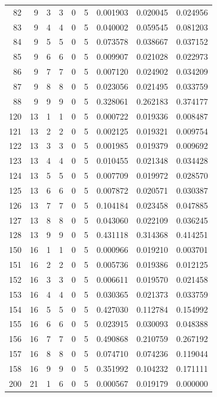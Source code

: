 \begin{longtable}{rrrrrrrrr}
82 & 9 & 3 & 3 & 0 & 5 & 0.001903 & 0.020045 & 0.024956 \\
83 & 9 & 4 & 4 & 0 & 5 & 0.040002 & 0.059545 & 0.081203 \\
84 & 9 & 5 & 5 & 0 & 5 & 0.073578 & 0.038667 & 0.037152 \\
85 & 9 & 6 & 6 & 0 & 5 & 0.009907 & 0.021028 & 0.022973 \\
86 & 9 & 7 & 7 & 0 & 5 & 0.007120 & 0.024902 & 0.034209 \\
87 & 9 & 8 & 8 & 0 & 5 & 0.023056 & 0.021495 & 0.033759 \\
88 & 9 & 9 & 9 & 0 & 5 & 0.328061 & 0.262183 & 0.374177 \\
120 & 13 & 1 & 1 & 0 & 5 & 0.000722 & 0.019336 & 0.008487 \\
121 & 13 & 2 & 2 & 0 & 5 & 0.002125 & 0.019321 & 0.009754 \\
122 & 13 & 3 & 3 & 0 & 5 & 0.001985 & 0.019379 & 0.009692 \\
123 & 13 & 4 & 4 & 0 & 5 & 0.010455 & 0.021348 & 0.034428 \\
124 & 13 & 5 & 5 & 0 & 5 & 0.007709 & 0.019972 & 0.028570 \\
125 & 13 & 6 & 6 & 0 & 5 & 0.007872 & 0.020571 & 0.030387 \\
126 & 13 & 7 & 7 & 0 & 5 & 0.104184 & 0.023458 & 0.047885 \\
127 & 13 & 8 & 8 & 0 & 5 & 0.043060 & 0.022109 & 0.036245 \\
128 & 13 & 9 & 9 & 0 & 5 & 0.431118 & 0.314368 & 0.414251 \\
150 & 16 & 1 & 1 & 0 & 5 & 0.000966 & 0.019210 & 0.003701 \\
151 & 16 & 2 & 2 & 0 & 5 & 0.005736 & 0.019386 & 0.012125 \\
152 & 16 & 3 & 3 & 0 & 5 & 0.006611 & 0.019570 & 0.021458 \\
153 & 16 & 4 & 4 & 0 & 5 & 0.030365 & 0.021373 & 0.033759 \\
154 & 16 & 5 & 5 & 0 & 5 & 0.427030 & 0.112784 & 0.154992 \\
155 & 16 & 6 & 6 & 0 & 5 & 0.023915 & 0.030093 & 0.048388 \\
156 & 16 & 7 & 7 & 0 & 5 & 0.490868 & 0.210759 & 0.267192 \\
157 & 16 & 8 & 8 & 0 & 5 & 0.074710 & 0.074236 & 0.119044 \\
158 & 16 & 9 & 9 & 0 & 5 & 0.351992 & 0.104232 & 0.171111 \\
200 & 21 & 1 & 6 & 0 & 5 & 0.000567 & 0.019179 & 0.000000 \\

\end{longtable}
